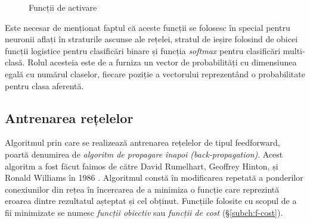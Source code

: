 \begin{figure}[ht]
\qquad
{}
\caption{Funcții de activare}\label{fig:sig+step+tanh+relu}
\end{figure}
Este necesar de menționat faptul că aceste funcții se folosesc în special pentru neuronii aflați în straturile ascunse ale rețelei, stratul de ieșire folosind de obicei funcții logistice pentru clasificări binare și funcția \textit{softmax} pentru clasificări multi-clasă. Rolul acesteia este de a furniza un vector de probabilități cu dimensiunea egală cu numărul claselor, fiecare poziție a vectorului reprezentând o probabilitate pentru clasa aferentă.

\subsection{Antrenarea rețelelor}\label{subch:antrenare}
Algoritmul prin care se realizează antrenarea rețelelor de tipul feedforward, poartă denumirea de \textit{algoritm de propagare înapoi (back-propagation)}. Acest algoritm a fost făcut faimos de către David Rumelhart, Geoffrey Hinton, și Ronald Williams în 1986 \cite{rumelhart1986}. Algoritmul constă în modificarea repetată a ponderilor conexiunilor din rețea în încercarea de a minimiza o funcție care reprezintă eroarea dintre rezultatul așteptat și cel obținut. Funcțiile folosite cu scopul de a fii minimizate se numesc \textit{funcții obiectiv} sau \textit{funcții de cost} (\S\ref{subch:f-cost}).

